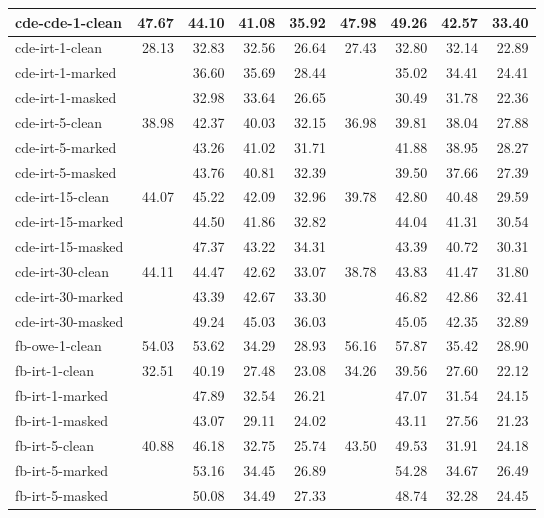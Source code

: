 \begin{tabular}{| l | r | r | r | r | r | r | r | r |}
    cde-cde-1-clean    & 47.67 & 44.10 & 41.08 & 35.92 & 47.98 & 49.26 & 42.57 & 33.40 \\ \hline
    cde-irt-1-clean    & 28.13 & 32.83 & 32.56 & 26.64 & 27.43 & 32.80 & 32.14 & 22.89 \\
    cde-irt-1-marked   &       & 36.60 & 35.69 & 28.44 &       & 35.02 & 34.41 & 24.41 \\
    cde-irt-1-masked   &       & 32.98 & 33.64 & 26.65 &       & 30.49 & 31.78 & 22.36 \\ \hline
    cde-irt-5-clean    & 38.98 & 42.37 & 40.03 & 32.15 & 36.98 & 39.81 & 38.04 & 27.88 \\
    cde-irt-5-marked   &       & 43.26 & 41.02 & 31.71 &       & 41.88 & 38.95 & 28.27 \\
    cde-irt-5-masked   &       & 43.76 & 40.81 & 32.39 &       & 39.50 & 37.66 & 27.39 \\ \hline
    cde-irt-15-clean   & 44.07 & 45.22 & 42.09 & 32.96 & 39.78 & 42.80 & 40.48 & 29.59 \\
    cde-irt-15-marked  &       & 44.50 & 41.86 & 32.82 &       & 44.04 & 41.31 & 30.54 \\
    cde-irt-15-masked  &       & 47.37 & 43.22 & 34.31 &       & 43.39 & 40.72 & 30.31 \\ \hline
    cde-irt-30-clean   & 44.11 & 44.47 & 42.62 & 33.07 & 38.78 & 43.83 & 41.47 & 31.80 \\
    cde-irt-30-marked  &       & 43.39 & 42.67 & 33.30 &       & 46.82 & 42.86 & 32.41 \\
    cde-irt-30-masked  &       & 49.24 & 45.03 & 36.03 &       & 45.05 & 42.35 & 32.89 \\ \hline \hline
    fb-owe-1-clean     & 54.03 & 53.62 & 34.29 & 28.93 & 56.16 & 57.87 & 35.42 & 28.90 \\ \hline
    fb-irt-1-clean     & 32.51 & 40.19 & 27.48 & 23.08 & 34.26 & 39.56 & 27.60 & 22.12 \\
    fb-irt-1-marked    &       & 47.89 & 32.54 & 26.21 &       & 47.07 & 31.54 & 24.15 \\
    fb-irt-1-masked    &       & 43.07 & 29.11 & 24.02 &       & 43.11 & 27.56 & 21.23 \\ \hline
    fb-irt-5-clean     & 40.88 & 46.18 & 32.75 & 25.74 & 43.50 & 49.53 & 31.91 & 24.18 \\
    fb-irt-5-marked    &       & 53.16 & 34.45 & 26.89 &       & 54.28 & 34.67 & 26.49 \\
    fb-irt-5-masked    &       & 50.08 & 34.49 & 27.33 &       & 48.74 & 32.28 & 24.45 \\ \hline

\end{tabular}
